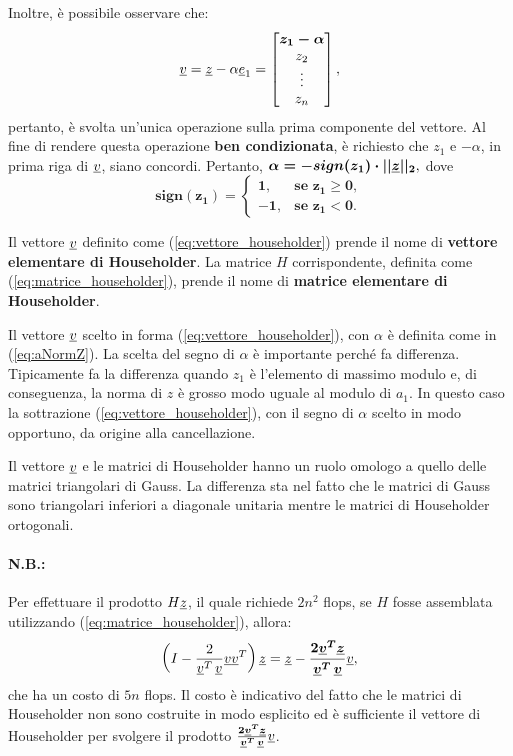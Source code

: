 Inoltre, è possibile osservare che:
\begin{equation*}
    \uline v= \uline z -\alpha\uline e_1 = 
    \begin{bmatrix}
        \boldsymbol{z_1 - \alpha}\\
        z_2\\
        \vdots\\
        z_n
    \end{bmatrix},
\end{equation*}
pertanto, è svolta un'unica operazione sulla prima componente del vettore. Al fine di rendere questa operazione \textbf{ben condizionata}, è richiesto che $z_1$ e $-\alpha$, in prima riga di $\uline v$, siano concordi. Pertanto, $\boldsymbol{\alpha=-sign(z_1)\cdot||\uline z||_2},$ dove
\begin{equation*}
    \boldsymbol{sign(z_1)=
    \begin{cases}
        1, &\text{se } z_1\geq 0,\\
        -1, & \text{se } z_1<0.
    \end{cases}}
\end{equation*}

\begin{definition}
    Il vettore $\uline v$ definito come (\ref{eq:vettore_householder}) prende il nome di \textbf{vettore elementare di Householder}. La matrice $H$ corrispondente, definita come (\ref{eq:matrice_householder}), prende il nome di \textbf{matrice elementare di Householder}.
\end{definition}

Il vettore $\uline v$ scelto in forma (\ref{eq:vettore_householder}), con $\alpha$ è definita come in (\ref{eq:aNormZ}). La scelta del segno di $\alpha$ è importante perché fa differenza. Tipicamente fa la differenza quando $z_1$ è l'elemento di massimo modulo e, di conseguenza, la norma di $z$ è grosso modo uguale al modulo di $a_1$. In questo caso la sottrazione (\ref{eq:vettore_householder}), con il segno di $\alpha$ scelto in modo opportuno, da origine alla cancellazione.

Il vettore $\uline v$ e le matrici di Householder hanno un ruolo omologo a quello delle matrici triangolari di Gauss. La differenza sta nel fatto che le matrici di Gauss sono triangolari inferiori a diagonale unitaria mentre le matrici di Householder ortogonali.

\paragraph{N.B.:} Per effettuare il prodotto $H\uline z$, il quale richiede $2n^2$ flops, se $H$ fosse assemblata utilizzando (\ref{eq:matrice_householder}), allora: 
\begin{equation*}
    \left(I-\frac{2}{\uline v^T\,\uline v}\uline v\uline v^T\right)\uline z=\uline z-\boldsymbol{\frac{2\uline v^T\uline z}{\uline v^T\,\uline v}}\uline v,
\end{equation*}
che ha un costo di $5n$ flops. Il costo è indicativo del fatto che le matrici di Householder non sono costruite in modo esplicito ed è sufficiente il vettore di Householder per svolgere il prodotto $\boldsymbol{\frac{2\uline v^T\uline z}{\uline v^T\,\uline v}}\uline v$.

